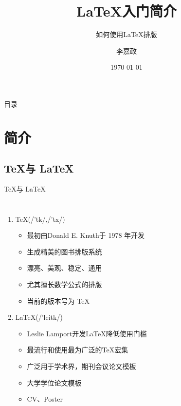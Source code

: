 \documentclass[UTF8,11pt]{beamer}
\title[如何使用\LaTeX 排版]{\LaTeX 入门简介}
\subtitle{如何使用\LaTeX 排版}
\author{李嘉政}
\date{\today}
\begin{document}
\begin{frame}
    \titlepage
\end{frame}

\begin{frame}{目录}
	\tableofcontents
\end{frame}


\section{简介}
\subsection{\TeX 与 \LaTeX}
\begin{frame}{\TeX 与 \LaTeX}
	\begin{columns}
		\column{8cm}
		\begin{enumerate}
		\item \TeX \quad(/'t\textepsilon k/,/'t\textepsilon x/)
		\begin{itemize}
			\item 最初由Donald E. Knuth于 1978 年开发
			\item 生成精美的图书排版系统
			\item 漂亮、美观、稳定、通用
			\item 尤其擅长数学公式的排版
			\item 当前的版本号为 \TeX {}
		\end{itemize}
		\item \LaTeX \quad(/'leit\textepsilon k/)
		\begin{itemize}
			\item Leslie Lamport开发\LaTeX 降低使用门槛
			\item 最流行和使用最为广泛的\TeX 宏集
			\item 广泛用于学术界，期刊会议论文模板
			\item 大学学位论文模板
			\item CV、Poster
		\end{itemize}
		\end{enumerate}
	\column{6cm}

\end{columns}
\end{frame}
\end{document}
